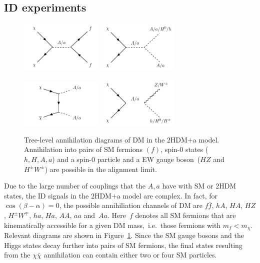 \documentclass[review]{elsarticle}
\newcommand{\hdma}{\ensuremath{\textrm{2HDM+a}}\xspace}
\begin{document}
\subsection{ID experiments}

\begin{figure}[t!]
\centering
\includegraphics[width=0.35\textwidth]{graph_2hdm_relic_s_fermions.pdf} \qquad 
\includegraphics[width=0.35\textwidth]{graph_2hdm_relic_s_bosons.pdf} 

\vspace{5mm}

\includegraphics[width=0.35\textwidth]{graph_2hdm_relic_ss_bosons.pdf} \qquad 
\includegraphics[width=0.35\textwidth]{graph_2hdm_relic_s_vbosons.pdf}
\vspace{4mm}
\caption{Tree-level annihilation diagrams of DM in the \hdma model. Annihilation into pairs of SM fermions $(f)$, spin-0 states ($h, H,A,a$) and a spin-0 particle and a EW gauge boson~($HZ$ and $H^\pm W^\pm$) are possible in the alignment limit.}
\label{fig:feyn_annihilation}
\end{figure}

Due to the large number of couplings that the $A, a$ have with SM or 2HDM states, the ID signals in the \hdma model are  complex. In fact, for~$\cos (\beta - \alpha) = 0$, the possible annihiliation channels of DM are $ f \bar f$, $hA$, $HA$, $HZ$,  $H^\pm W^\mp$, $ha$, $Ha$, $AA$, $aa$ and~$Aa$.  Here~$f$ denotes all SM fermions that are kinematically accessible for a given DM mass,~i.e.~those fermions with $m_f < m_\chi$. Relevant diagrams are shown in Figure~\ref{fig:feyn_annihilation}. Since the SM gauge bosons and the Higgs states decay further into pairs of SM fermions, the final states resulting from the $\chi \bar \chi$ annihilation can contain either two or four SM particles. 
\end{document}

